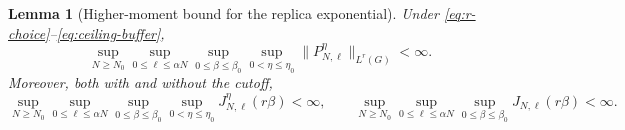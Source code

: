 \documentclass[11pt,reqno]{amsart}
\numberwithin{equation}{section}
\theoremstyle{plain}
\newtheorem{lemma}[lemma]{Lemma}
\theoremstyle{definition}
\newcommand{\be}{\beta}
\begin{document}
\begin{lemma}[Higher-moment bound for the replica exponential]\label{lem:replica-buffer}
Under \eqref{eq:r-choice}--\eqref{eq:ceiling-buffer},
\begin{equation}\label{eq:replica-Gaussian-buffer}
 \sup_{N\geq N_0}\sup_{0\leq\ell\leq\alpha N}\sup_{0\leq\be\leq\be_0}\sup_{0<\eta\leq\eta_0}
 \|P_{N,\ell}^{\eta}\|_{L^r(G)}<\infty.
\end{equation}
Moreover, both with and without the cutoff,
\begin{equation}\label{eq:replica-particle-buffer}
 \sup_{N\geq N_0}\sup_{0\leq\ell\leq\alpha N}\sup_{0\leq\be\leq\be_0}\sup_{0<\eta\leq\eta_0}
 J_{N,\ell}^{\eta}(r\be)<\infty,
 \qquad
 \sup_{N\geq N_0}\sup_{0\leq\ell\leq\alpha N}\sup_{0\leq\be\leq\be_0}
 J_{N,\ell}(r\be)<\infty.
\end{equation}
\end{lemma}
\end{document}
